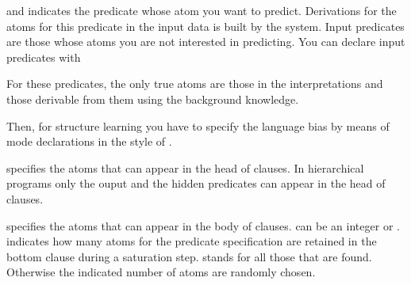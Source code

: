 \documentclass[letterpaper,10pt,english]{sphinxmanual}
\begin{document}
and indicates the predicate whose atom you want to predict.
Derivations for the atoms for this predicate in the input data is built by the system.
Input predicates are those whose atoms you are not interested in predicting.
You can declare input predicates with

%
\begin{sphinxVerbatim}[commandchars=\\\{\}]
\end{sphinxVerbatim}

For these predicates, the only true atoms are those in the interpretations and those derivable from them using the background knowledge.

Then, for structure learning you have to specify the language bias by means of mode declarations in the style of .

%
\begin{sphinxVerbatim}[commandchars=\\\{\}]
\end{sphinxVerbatim}

specifies the atoms that can appear in the head of clauses. In hierarchical programs only the ouput and the hidden predicates can appear in the head of clauses.

%
\begin{sphinxVerbatim}[commandchars=\\\{\}]
\end{sphinxVerbatim}

specifies the atoms that can appear in the body of clauses.  can be an integer or \sphinxcode{*}.  indicates how many atoms for the predicate specification are retained in the bottom clause during a saturation step. \sphinxcode{*} stands for all those that are found.
Otherwise the indicated number of atoms are randomly chosen.
\end{document}
